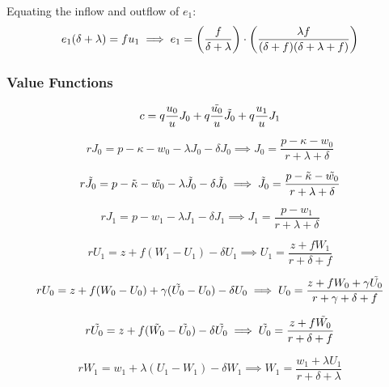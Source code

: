 \documentclass[12pt]{article} %
\theoremstyle{definition}
\begin{document}
Equating the inflow and outflow of $e_1$:
\begin{equation}
    e_1(\delta + \lambda) = f u_1 \\
    \implies e_1 = \left(\frac{f}{\delta+\lambda}\right) \cdot \left(\frac{\lambda f}{(\delta+f)(\delta + \lambda + f)} \right) 
\end{equation}
\subsubsection{Value Functions}

\begin{equation}
    c = q \frac{u_0}{u}J_0 + q \frac{\Tilde{u_0}}{u} \Tilde{J_0} + q \frac{u_1}{u}J_1
\end{equation}

\begin{equation}
    rJ_0 =p-\kappa-w_0-\lambda J_0 - \delta J_0 \implies J_0 = \frac{p-
    \kappa-w_0}{r + \lambda + \delta}
\end{equation}

\begin{equation}
    r\Tilde{J_0} =p-\Tilde{\kappa}-\Tilde{w_0}-\lambda \Tilde{J_0} - \delta \Tilde{J_0} \implies \Tilde{J_0} = \frac{p-\Tilde{\kappa}-\Tilde{w_0}}{r + \lambda + \delta}
\end{equation}

\begin{equation}
    rJ_1 =p-w_1-\lambda J_1 - \delta J_1 \implies J_1 = \frac{p-w_1}{r + \lambda + \delta}
\end{equation}

\begin{equation}
    rU_1 =z+f(W_1-U_1)- \delta U_1 \implies U_1 = \frac{z + f W_1}{r + \delta + f}
\end{equation}

\begin{equation}
    rU_0 =z+f(W_0-U_0)+\gamma(\Tilde{U_0}-U_0) - \delta U_0 \implies U_0 = \frac{z + f W_0 + \gamma \Tilde{U_0}}{r + \gamma + \delta + f}
\end{equation}

\begin{equation}
    r\Tilde{U_0} =z+f(\Tilde{W_0}-\Tilde{U_0})- \delta \Tilde{U_0} \implies \Tilde{U_0} = \frac{z + f\Tilde{W_0}}{r + \delta + f}
\end{equation}

\begin{equation}
    rW_1 =w_1+\lambda(U_1-W_1)- \delta W_1 \implies W_1 = \frac{w_1 + \lambda U_1}{r + \delta + \lambda}
\end{equation}
\end{document}
